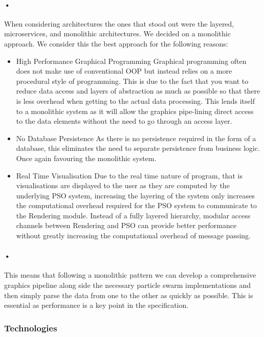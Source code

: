 \documentclass[11pt]{article}
\begin{document}
\paragraph{•}
When considering architectures the ones that stood out were the layered, microservices, and monolithic architectures.
We decided on a monolithic approach. We consider this the best approach for the following reasons:
\begin{itemize}
	\item{High Performance Graphical Programming} 
		Graphical programming often does not make use of conventional OOP but instead relies on a more procedural style of programming. This is due to the fact that you want to reduce data access and layers of abstraction as much as possible so that there is less overhead when getting to the actual data processing. This lends itself to a monolithic system as it will allow the graphics pipe-lining direct access to the data elements without the need to go through an access layer.
	\item{No Database Persistence}
		As there is no persistence required in the form of a database, this eliminates the need to separate persistence from business logic. Once again favouring the monolithic system.
	\item{Real Time Visualisation}
	Due to the real time nature of program, that is visualisations are displayed to the user as they are computed by the underlying PSO system, increasing the layering of the system only increases the computational overhead required for the PSO system to communicate to the Rendering module. Instead of a fully layered hierarchy, modular access channels between Rendering and PSO can provide better performance without greatly increasing the computational overhead of message passing.	
\end{itemize}

\paragraph{•}
This means that following a monolithic pattern we can develop a comprehensive graphics pipeline along side the necessary particle swarm implementations and then simply parse the data from one to the other as quickly as possible. This is essential as performance is a key point in the specification.


\subsubsection{Technologies}
\end{document}

